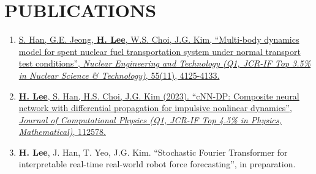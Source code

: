 \documentclass[a4paper,10pt]{extarticle}
\begin{document}
\section*{PUBLICATIONS}
\noindent
\begin{enumerate}[leftmargin=.5cm]
	\item \href{https://www.google.com/url?sa=t&rct=j&q=&esrc=s&source=web&cd=&cad=rja&uact=8&ved=2ahUKEwij36zWpNKCAxXMMEQIHSBfBMUQFnoECBEQAQ&url=https%3A%2F%2Fwww.sciencedirect.com%2Fscience%2Farticle%2Fpii%2FS1738573323003492&usg=AOvVaw1zj_G3k5c77uhMNnmu0EEC&opi=89978449}{S. Han, G.E. Jeong, \textbf{H. Lee}, W.S. Choi, J.G. Kim, “Multi-body dynamics model for spent nuclear fuel transportation system under normal transport test conditions”, \textit{Nuclear Engineering and Technology (Q1, JCR-IF Top 3.5\% in Nuclear Science \& Technology)}, 55(11), 4125-4133.}
	\item \href{https://www.sciencedirect.com/science/article/pii/S0021999123006733?casa_token=ARUkhI8XI8YAAAAA:wTzCIauJvSlonWw-J-SlAFqPX6NZRQS-qBX59l4YN5O3caEppoglU0duVmMkZYf4nWYd7tm_D_E}{\textbf{H. Lee}, S. Han, H.S. Choi, J.G. Kim (2023). “cNN-DP: Composite neural network with differential propagation for impulsive nonlinear dynamics”, \textit{Journal of Computational Physics (Q1, JCR-IF Top 4.5\% in Physics, Mathematical)}, 112578.}
	\item \textbf{H. Lee}, J. Han, T. Yeo, J.G. Kim. “Stochastic Fourier Transformer for interpretable real-time real-world robot force forecasting”, in preparation.
\end{enumerate}

\end{document}
